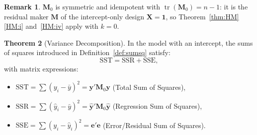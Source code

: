 \documentclass[12pt,a4paper]{article}
\theoremstyle{definition}
\newtheorem{theorem}{Theorem}[section]
\newtheorem{remark}[theorem]{Remark}
\DeclareMathOperator\tr{tr}
\newcommand{\SST}{\mathrm{SST}}
\newcommand{\SSR}{\mathrm{SSR}}
\newcommand{\SSE}{\mathrm{SSE}}
\newcommand{\bX}{\mathbf{X}}
\newcommand{\by}{\mathbf{y}}
\newcommand{\bM}{\mathbf{M}}
\newcommand{\bone}{\mathbf{1}}
\begin{document}
\begin{remark}\label{rem:M0-props}
$\bM_0$ is symmetric and idempotent with $\tr(\bM_0) = n - 1$: it is the residual maker $\bM$ of the intercept-only design $\bX = \bone$, so Theorem~\ref{thm:HM}\ref{HM:i} and~\ref{HM:iv} apply with $k = 0$.
\end{remark}

\begin{theorem}[Variance Decomposition]\label{thm:anova}
In the model with an intercept, the sums of squares introduced in Definition~\ref{def:sumsq} satisfy:
\begin{equation}
\boxed{\SST = \SSR + \SSE,}
\end{equation}
with matrix expressions:
\begin{itemize}
\item $\SST = \sum(y_i - \bar{y})^2 = \by'\bM_0\by$ \quad (Total Sum of Squares),
\item $\SSR = \sum(\hat{y}_i - \bar{y})^2 = \hat{\by}'\bM_0\hat{\by}$ \quad (Regression Sum of Squares),
\item $\SSE = \sum(y_i - \hat{y}_i)^2 = \mathbf{e}'\mathbf{e}$ \quad (Error/Residual Sum of Squares).
\end{itemize}
\end{theorem}
\end{document}
